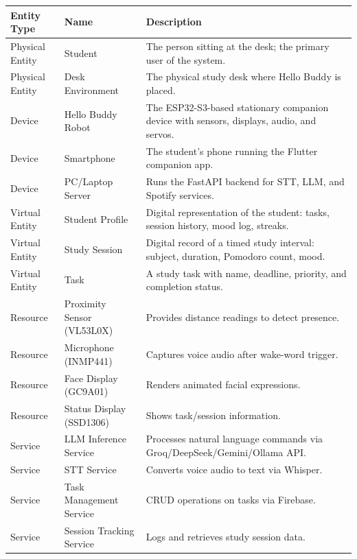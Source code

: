 \documentclass[12pt,a4paper]{article}
\begin{document}
\begin{center}
\label{tab:domain}
\scriptsize
\begin{tabular}{|L{0.14\textwidth}|L{0.16\textwidth}|L{0.58\textwidth}|}
\hline
\textbf{Entity Type} & \textbf{Name} & \textbf{Description} \\ \hline
Physical Entity & Student & The person sitting at the desk; the primary
                            user of the system. \\ \hline
Physical Entity & Desk Environment & The physical study desk where Hello
                                     Buddy is placed. \\ \hline
Device & Hello Buddy Robot & The ESP32-S3-based stationary companion
                             device with sensors, displays, audio, and
                             servos. \\ \hline
Device & Smartphone & The student's phone running the Flutter
                      companion app. \\ \hline
Device & PC/Laptop Server & Runs the FastAPI backend for STT, LLM, and
                            Spotify services. \\ \hline
Virtual Entity & Student Profile & Digital representation of the
                                   student: tasks, session history,
                                   mood log, streaks. \\ \hline
Virtual Entity & Study Session & Digital record of a timed study
                                 interval: subject, duration, Pomodoro
                                 count, mood. \\ \hline
Virtual Entity & Task & A study task with name, deadline, priority,
                        and completion status. \\ \hline
Resource & Proximity Sensor (VL53L0X) & Provides distance readings to
                                         detect presence. \\ \hline
Resource & Microphone (INMP441) & Captures voice audio after wake-word
                                  trigger. \\ \hline
Resource & Face Display (GC9A01) & Renders animated facial
                                   expressions. \\ \hline
Resource & Status Display (SSD1306) & Shows task/session
                                      information. \\ \hline
Service & LLM Inference Service & Processes natural language commands
                                  via Groq/DeepSeek/Gemini/Ollama
                                  API. \\ \hline
Service & STT Service & Converts voice audio to text via Whisper. \\ \hline
Service & Task Management Service & CRUD operations on tasks via
                                    Firebase. \\ \hline
Service & Session Tracking Service & Logs and retrieves study session
                                     data. \\ \hline
\end{tabular}
\end{center}
\end{document}
